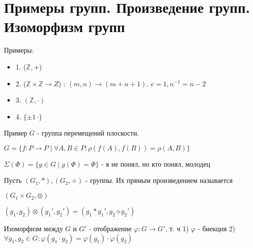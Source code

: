 
\section{Примеры групп. Произведение групп. Изоморфизм групп}
Примеры:
\begin{itemize}
\item[] 1. ($\mathbb{Z}, +$)
\item[] 2. ($\mathbb{Z}\times \mathbb{Z} \to Z$) : $(m, n) \to (m+n+1)$. $e=1, n^{-1}=n-2$
\item[] 3. $(\mathbb{Z}, \cdot)$
\item[] 4. $\{\pm 1\, \cdot \}$
\end{itemize}

Пример $G$ - группа перемещений плоскости.

$G = \{f: P \to P \mid \forall A, B \in P : \rho (f(A), f(B)) = \rho(A, B)\}$

$\Sigma(\Phi) = \{g \in G \mid g(\Phi) = \Phi\}$ - я не понял, но кто понял, молодец

\begin{conj}
    Пусть $(G_1, *), (G_2, \diamond)$ - группы. Их прямым произведением называется
    
    $(G_1\times G_2, \otimes)$
    
    $(g_1, g_2)\otimes (g_1', g_2') = (g_1*g_1', g_2\diamond g_2')$
\end{conj}
\begin{conj}
    Изоморфизм между $G$ и $G'$ - отображение $\varphi : G \to G'$, т. ч
        1) $\varphi$ - биекция
        2) $\forall g_1, g_2 \in G : \varphi (g_1\cdot  g_2) = \varphi (g_1)\cdot \varphi(g_2)$
\end{conj}